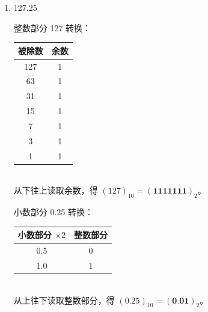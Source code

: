 \documentclass[10pt, a4paper]{article}
\begin{document}
{\begin{enumerate}
    \item 127.25 \\
    \begin{minipage}[t]{0.48\textwidth}
        整数部分 127 转换：\\
        \begin{tabular}{|c|c|}
            \hline
            被除数 & 余数 \\ \hline
            127 & 1 \\ \hline
            63  & 1 \\ \hline
            31  & 1 \\ \hline
            15  & 1 \\ \hline
            7   & 1 \\ \hline
            3   & 1 \\ \hline
            1   & 1 \\ \hline
        \end{tabular}\\
        从下往上读取余数，得 $(127)_{10}=(\textbf{1111111})_2$。
    \end{minipage}
    \hfill
    \begin{minipage}[t]{0.48\textwidth}
        小数部分 0.25 转换：\\
        \begin{tabular}{|c|c|}
            \hline
            小数部分 $\times 2$ & 整数部分 \\ \hline
            0.5 & 0 \\ \hline
            1.0 & 1 \\ \hline
        \end{tabular}\\
        从上往下读取整数部分，得 $(0.25)_{10}=(\textbf{0.01})_2$。
    \end{minipage}
    
    

\end{enumerate}}
\end{document}
